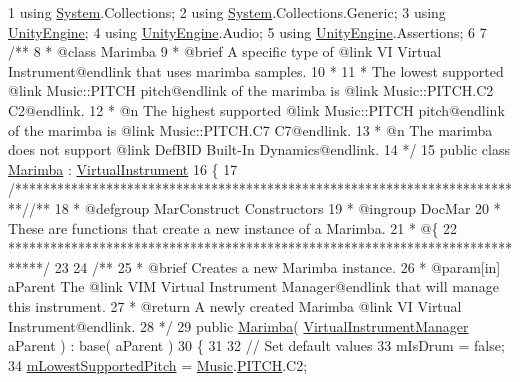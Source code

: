 \begin{DoxyCodeInclude}
1 \textcolor{keyword}{using} \hyperlink{namespace_system}{System}.Collections;
2 \textcolor{keyword}{using} \hyperlink{namespace_system}{System}.Collections.Generic;
3 \textcolor{keyword}{using} \hyperlink{namespace_unity_engine}{UnityEngine};
4 \textcolor{keyword}{using} \hyperlink{namespace_unity_engine}{UnityEngine}.Audio;
5 \textcolor{keyword}{using} \hyperlink{namespace_unity_engine}{UnityEngine}.Assertions;
6 \textcolor{comment}{}
7 \textcolor{comment}{/**}
8 \textcolor{comment}{ * @class Marimba}
9 \textcolor{comment}{ * @brief A specific type of @link VI Virtual Instrument@endlink that uses marimba samples.}
10 \textcolor{comment}{ * }
11 \textcolor{comment}{ * The lowest supported @link Music::PITCH pitch@endlink of the marimba is @link Music::PITCH.C2
       C2@endlink.}
12 \textcolor{comment}{ * @n The highest supported @link Music::PITCH pitch@endlink of the marimba is @link Music::PITCH.C7
       C7@endlink.}
13 \textcolor{comment}{ * @n The marimba does not support @link DefBID Built-In Dynamics@endlink.}
14 \textcolor{comment}{*/}
15 \textcolor{keyword}{public} \textcolor{keyword}{class }\hyperlink{class_marimba}{Marimba} : \hyperlink{class_virtual_instrument}{VirtualInstrument}
16 \{
17     \textcolor{comment}{/*************************************************************************/}\textcolor{comment}{/** }
18 \textcolor{comment}{    * @defgroup MarConstruct Constructors}
19 \textcolor{comment}{    * @ingroup DocMar}
20 \textcolor{comment}{    * These are functions that create a new instance of a Marimba.}
21 \textcolor{comment}{    * @\{}
22 \textcolor{comment}{    *****************************************************************************/}
23 \textcolor{comment}{}
24 \textcolor{comment}{    /**}
25 \textcolor{comment}{     * @brief Creates a new Marimba instance.}
26 \textcolor{comment}{     * @param[in] aParent The @link VIM Virtual Instrument Manager@endlink that will manage this
       instrument.}
27 \textcolor{comment}{     * @return A newly created Marimba @link VI Virtual Instrument@endlink.}
28 \textcolor{comment}{    */}
29     \textcolor{keyword}{public} \hyperlink{group___mar_construct_ga48c946fe0f78f8905a8e4d063cbc0fa2}{Marimba}( \hyperlink{class_virtual_instrument_manager}{VirtualInstrumentManager} aParent ) : base( aParent )
30     \{
31 
32         \textcolor{comment}{// Set default values}
33         mIsDrum = \textcolor{keyword}{false};
34         \hyperlink{group___v_i_base_pro_var_ga3cae52b1bcc0178a8a6b03c7aaf7aac8}{mLowestSupportedPitch} = \hyperlink{class_music}{Music}.\hyperlink{group___music_enums_ga508f69b199ea518f935486c990edac1d}{PITCH}.C2;

\end{DoxyCodeInclude}
